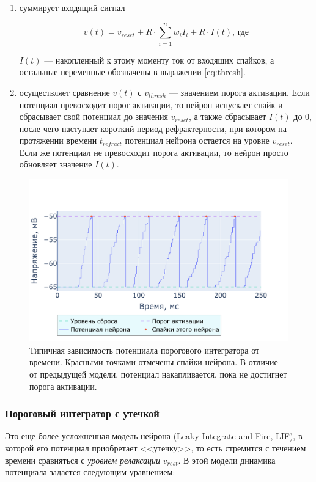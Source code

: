 \documentclass[a4paper]{article}
\begin{document}
\begin{enumerate}
 \item суммирует входящий сигнал

\begin{equation} \label{eq:if}
v(t) = v_{reset} + R \cdot \sum_{i=1}^n {w_i I_i} + R \cdot I(t) \text{, где}
\end{equation}

$I(t)$ --- накопленный к этому моменту ток от входящих спайков, а остальные переменные обозначены в выражении \ref{eq:thresh}.

\item осуществляет сравнение $v(t)$ с $v_{thresh}$ --- значением порога активации. Если потенциал превосходит порог активации, то нейрон испускает спайк и сбрасывает свой потенциал до значения $v_{reset}$, а также сбрасывает $I(t)$ до 0, после чего наступает короткий период рефрактерности, при котором на протяжении времени $t_{refract}$ потенциал нейрона остается на уровне $v_{reset}$. Если же потенциал не превосходит порога активации, то нейрон просто обновляет значение $I(t)$.
\end{enumerate}

\begin{center}
\begin{figure}[H] 
 \includegraphics[width=\textwidth,keepaspectratio=true]{model_if_ru.pdf}
 \caption{Типичная зависимость потенциала порогового интегратора от времени. Красными точками отмечены спайки нейрона. В отличие от предыдущей модели, потенциал накапливается, пока не достигнет порога активации.}
\end{figure}
\end{center} 

\subsubsection{Пороговый интегратор с утечкой}
Это еще более усложненная модель нейрона (Leaky-Integrate-and-Fire, LIF), в которой его потенциал приобретает <<утечку>>, то есть стремится с течением времени сравняться с \textit{уровнем релаксации} $v_{rest}$. В этой модели динамика потенциала задается следующим уравнением:
\end{document}
